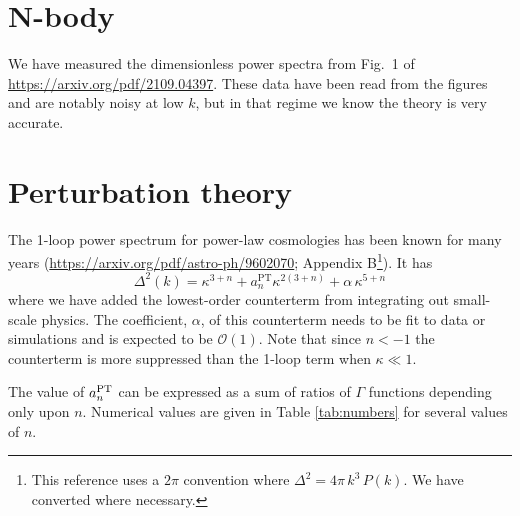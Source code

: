 \documentclass{article}
\begin{document}
\section{N-body}

We have measured the dimensionless power spectra from Fig.~1 of \url{https://arxiv.org/pdf/2109.04397}.  These data have been read from the figures and are notably noisy at low $k$, but in that regime we know the theory is very accurate.

\section{Perturbation theory}

The 1-loop power spectrum for power-law cosmologies has been known for many years (\url{https://arxiv.org/pdf/astro-ph/9602070}; Appendix B\footnote{This reference uses a $2\pi$ convention where $\Delta^2=4\pi\,k^3\,P(k)$.  We have converted where necessary.}).  It has
\begin{equation}
    \Delta^2(k) = \kappa^{3+n} + a_n^\mathrm{PT} \kappa^{2(3+n)} + \alpha\, \kappa^{5+n}
\end{equation}
where we have added the lowest-order counterterm from integrating out small-scale physics.  The coefficient, $\alpha$, of this counterterm needs to be fit to data or simulations and is expected to be $\mathcal{O}(1)$.  Note that since $n<-1$ the counterterm is more suppressed than the 1-loop term when $\kappa\ll 1$.

The value of $a_n^{\rm PT}$ can be expressed as a sum of ratios of $\Gamma$ functions depending only upon $n$.  Numerical values are given in Table \ref{tab:numbers} for several values of $n$.
\end{document}
